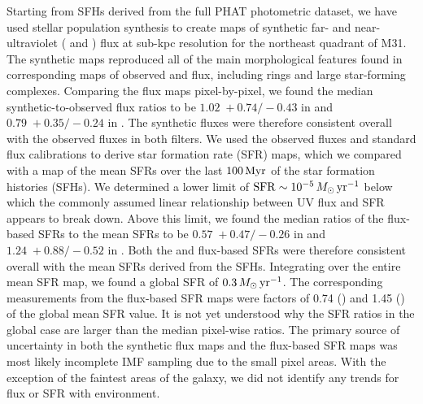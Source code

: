Starting from SFHs derived from the full PHAT photometric dataset, we
have used stellar population synthesis to create maps of synthetic far- and
near-ultraviolet (\fuv{} and \nuv{}) flux at sub-kpc resolution for the
northeast quadrant of M31. The synthetic maps reproduced all of the main
morphological features found in corresponding maps of observed \fuv{} and
\nuv{} flux, including rings and large star-forming complexes. Comparing the
flux maps pixel-by-pixel, we found the median synthetic-to-observed flux ratios
to be $1.02 \;+\!0.74/\!-\!0.43$ in \fuv{} and $0.79 \;+\!0.35/\!-\!0.24$ in
\nuv{}. The synthetic fluxes were therefore consistent overall with the
observed fluxes in both filters. We used the observed fluxes and standard flux
calibrations to derive star formation rate (SFR) maps, which we compared with a
map of the mean SFRs over the last $100\,\mathrm{Myr}$ of the star formation histories
(SFHs). We determined a lower limit of $\mathrm{SFR} \sim 10^{-5}\,M_\odot\,\mathrm{yr}^{-1}$ below
which the commonly assumed linear relationship between UV flux and SFR appears
to break down. Above this limit, we found the median ratios of the flux-based
SFRs to the mean SFRs to be $0.57 \;+\!0.47/\!-\!0.26$ in \fuv{} and $1.24
\;+\!0.88/\!-\!0.52$ in \nuv{}. Both the \fuv{} and \nuv{} flux-based SFRs were
therefore consistent overall with the mean SFRs derived from the SFHs.
Integrating over the entire mean SFR map, we found a global SFR of
$0.3\,M_\odot\,\mathrm{yr}^{-1}$. The corresponding measurements from the flux-based SFR maps
were factors of 0.74 (\fuv{}) and 1.45 (\nuv{}) of the global mean SFR value.
It is not yet understood why the SFR ratios in the global case are larger than
the median pixel-wise ratios. The primary source of uncertainty in both the
synthetic flux maps and the flux-based SFR maps was most likely incomplete IMF
sampling due to the small pixel areas. With the exception of the faintest areas
of the galaxy, we did not identify any trends for flux or SFR with environment.
